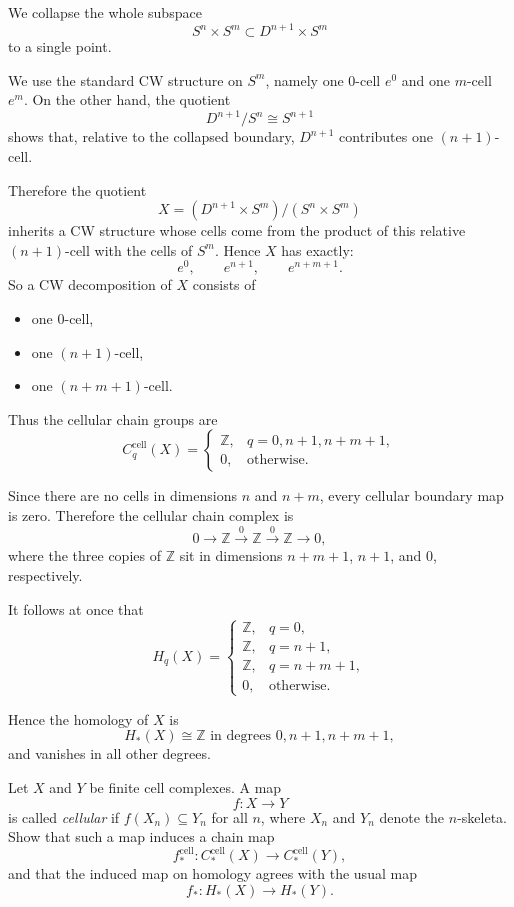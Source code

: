\begin{solution}
We collapse the whole subspace
\[
S^n\times S^m \subset D^{n+1}\times S^m
\]
to a single point.

We use the standard CW structure on \(S^m\), namely one \(0\)-cell \(e^0\) and one \(m\)-cell \(e^m\). On the other hand, the quotient
\[
D^{n+1}/S^n \cong S^{n+1}
\]
shows that, relative to the collapsed boundary, \(D^{n+1}\) contributes one \((n+1)\)-cell.

Therefore the quotient
\[
X=(D^{n+1}\times S^m)/(S^n\times S^m)
\]
inherits a CW structure whose cells come from the product of this relative \((n+1)\)-cell with the cells of \(S^m\). Hence \(X\) has exactly:
\[
e^0,\qquad e^{n+1},\qquad e^{n+m+1}.
\]
So a CW decomposition of \(X\) consists of
\begin{itemize}
	\item one \(0\)-cell,
	\item one \((n+1)\)-cell,
	\item one \((n+m+1)\)-cell.
\end{itemize}

Thus the cellular chain groups are
\[
C_q^{\mathrm{cell}}(X)=
\begin{cases}
	\mathbb Z, & q=0,n+1,n+m+1,\\[4pt]
	0, & \text{otherwise}.
\end{cases}
\]

Since there are no cells in dimensions \(n\) and \(n+m\), every cellular boundary map is zero. Therefore the cellular chain complex is
\[
0 \longrightarrow \mathbb Z
\overset{0}{\longrightarrow}
\mathbb Z
\overset{0}{\longrightarrow}
\mathbb Z
\longrightarrow 0,
\]
where the three copies of \(\mathbb Z\) sit in dimensions \(n+m+1\), \(n+1\), and \(0\), respectively.

It follows at once that
\[
H_q(X)=
\begin{cases}
	\mathbb Z, & q=0,\\[4pt]
	\mathbb Z, & q=n+1,\\[4pt]
	\mathbb Z, & q=n+m+1,\\[4pt]
	0, & \text{otherwise}.
\end{cases}
\]

Hence the homology of \(X\) is
\[
H_*(X)\cong \mathbb Z \text{ in degrees }0,n+1,n+m+1,
\]
and vanishes in all other degrees.

\par
\end{solution}

\begin{problem}
Let \(X\) and \(Y\) be finite cell complexes. A map
\[
f:X\to Y
\]
is called \emph{cellular} if \(f(X_n)\subseteq Y_n\) for all \(n\), where \(X_n\) and \(Y_n\) denote the \(n\)-skeleta. Show that such a map induces a chain map
\[
f_*^{\mathrm{cell}}:C_*^{\mathrm{cell}}(X)\to C_*^{\mathrm{cell}}(Y),
\]
and that the induced map on homology agrees with the usual map
\[
f_*:H_*(X)\to H_*(Y).
\]

\par
\end{problem}

